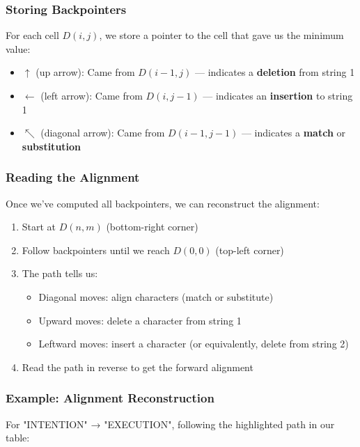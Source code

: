 \documentclass[11pt,a4paper]{article}
\theoremstyle{definition}
\theoremstyle{plain}
\theoremstyle{remark}
\begin{document}
\subsubsection{Storing Backpointers}

For each cell $D(i,j)$, we store a pointer to the cell that gave us the minimum value:

\begin{itemize}
    \item \textbf{$\uparrow$} (up arrow): Came from $D(i-1,j)$ — indicates a \textbf{deletion} from string 1
    \item \textbf{$\leftarrow$} (left arrow): Came from $D(i,j-1)$ — indicates an \textbf{insertion} to string 1
    \item \textbf{$\nwarrow$} (diagonal arrow): Came from $D(i-1,j-1)$ — indicates a \textbf{match} or \textbf{substitution}
\end{itemize}

\subsubsection{Reading the Alignment}

Once we've computed all backpointers, we can reconstruct the alignment:

\begin{enumerate}
    \item Start at $D(n,m)$ (bottom-right corner)
    \item Follow backpointers until we reach $D(0,0)$ (top-left corner)
    \item The path tells us:
    \begin{itemize}
        \item Diagonal moves: align characters (match or substitute)
        \item Upward moves: delete a character from string 1
        \item Leftward moves: insert a character (or equivalently, delete from string 2)
    \end{itemize}
    \item Read the path in reverse to get the forward alignment
\end{enumerate}

\subsubsection{Example: Alignment Reconstruction}

For "INTENTION" → "EXECUTION", following the highlighted path in our table:
\end{document}
